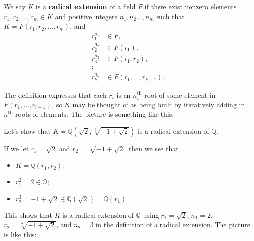 \begin{definition}
We say $K$ is a \textbf{radical extension} of a field $F$ if there exist nonzero elements $r_1,r_2,\ldots,r_m\in K$ and positive integers $n_1,n_2\ldots,n_m$ such that $K = F(r_1,r_2,\ldots,r_m)$, and 
\begin{align*}
 r_1^{n_1} &\in F,\\
 r_2^{n_2} &\in F(r_1),\\
 r_3^{n_3} &\in F(r_1,r_2),\\
 \vdots & \\
 r_k^{n_k} &\in F(r_1,\ldots,r_{k-1}).
\end{align*}
\end{definition}
The definition expresses that each $r_i$ is an $n_i^\text{th}$-root of some element in $F(r_1,\ldots,r_{i-1})$, so $K$ may be thought of as being built by iteratively adding in $n^\text{th}$-roots of elements. The picture is something like this:
\begin{center}
\end{center}

\begin{example}
Let's show that $K= \mathbb{Q}\left(\sqrt{2},\sqrt[3]{-1 + \sqrt{2}}\right)$ is a radical extension of $\mathbb{Q}$. 

If we let $r_1 = \sqrt{2}$ and $r_2 = \sqrt[3]{-1 + \sqrt{2}}$, then we see that
\begin{itemize}
\item $K = \mathbb{Q}\left(r_1,r_2\right)$;
\item $r_1^2 = 2 \in \mathbb{Q}$; 
\item $r_2^3 = -1 + \sqrt{2} \in \mathbb{Q}\left(\sqrt{2}\right) = \mathbb{Q}\left(r_1\right)$.
\end{itemize}
This shows that $K$ is a radical extension of $\mathbb{Q}$ using $r_1 = \sqrt{2}$, $n_1 = 2$, $r_2 = \sqrt[3]{-1 + \sqrt{2}}$, and $n_2 = 3$ in the definition of a radical extension. The picture is like this:
\begin{center}
\end{center}
\end{example}

